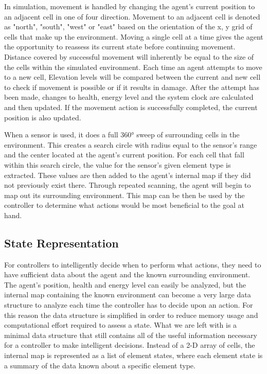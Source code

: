 In simulation, movement is handled by changing the agent's current position to an adjacent cell in one of four direction.
Movement to an adjacent cell is denoted as "north", "south", "west" or "east" based on the orientation of the x, y grid of cells that make up the environment.
Moving a single cell at a time gives the agent the opportunity to reassess its current state before continuing movement.
Distance covered by successful movement will inherently be equal to the size of the cells within the simulated environment.
Each time an agent attempts to move to a new cell, Elevation levels will be compared between the current and new cell to check if movement is possible or if it results in damage.
After the attempt has been made, changes to health, energy level and the system clock are calculated and then updated.
If the movement action is successfully completed, the current position is also updated.

When a sensor is used, it does a full 360° sweep of surrounding cells in the environment.
This creates a search circle with radius equal to the sensor's range and the center located at the agent's current position.
For each cell that fall within this search circle, the value for the sensor's given element type is extracted.
These values are then added to the agent's internal map if they did not previously exist there.
Through repeated scanning, the agent will begin to map out its surrounding environment.
This map can be then be used by the controller to determine what actions would be most beneficial to the goal at hand.


\subsection{State Representation}
For controllers to intelligently decide when to perform what actions, they need to have sufficient data about the agent and the known surrounding environment.
The agent's position, health and energy level can easily be analyzed, but the internal map containing the known environment can become a very large data structure to analyze each time the controller has to decide upon an action.
For this reason the data structure is simplified in order to reduce memory usage and computational effort required to assess a state.
What we are left with is a minimal data structure that still contains all of the useful information necessary for a controller to make intelligent decisions.
Instead of a 2-D array of cells, the internal map is represented as a list of element states, where each element state is a summary of the data known about a specific element type.


